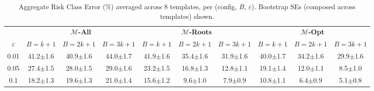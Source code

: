 \providecommand{\pmstd}[1]{{\scriptsize $\pm$#1}}

\begin{table}[t]
\centering
\small
\caption{Aggregate Risk Class Error (\%) averaged across 8 templates, per (config, $B$, $\varepsilon$). Bootstrap SEs (composed across templates) shown.}
\label{tab:agent_aggregate_rce}
\begin{tabular}{c|ccc|ccc|ccc}
\toprule
& \multicolumn{3}{c|}{\textbf{$\mathcal{M}$-All}} & \multicolumn{3}{c|}{\textbf{$\mathcal{M}$-Roots}} & \multicolumn{3}{c}{\textbf{$\mathcal{M}$-Opt}} \\
$\varepsilon$ & $B{=}k+1$ & $B{=}2k+1$ & $B{=}3k+1$ & $B{=}k+1$ & $B{=}2k+1$ & $B{=}3k+1$ & $B{=}k+1$ & $B{=}2k+1$ & $B{=}3k+1$ \\
\midrule
0.01 & 41.2\pmstd{1.6} & 40.9\pmstd{1.6} & 44.0\pmstd{1.7} & 41.9\pmstd{1.6} & 35.4\pmstd{1.6} & 31.9\pmstd{1.6} & 40.0\pmstd{1.7} & 34.2\pmstd{1.6} & 29.9\pmstd{1.6} \\
0.05 & 27.4\pmstd{1.5} & 28.0\pmstd{1.5} & 29.0\pmstd{1.6} & 23.2\pmstd{1.5} & 16.8\pmstd{1.3} & 12.8\pmstd{1.1} & 19.1\pmstd{1.4} & 12.0\pmstd{1.1} & 8.5\pmstd{1.0} \\
0.1 & 18.2\pmstd{1.3} & 19.6\pmstd{1.3} & 21.0\pmstd{1.4} & 15.6\pmstd{1.2} & 9.6\pmstd{1.0} & 7.9\pmstd{0.9} & 10.8\pmstd{1.1} & 6.4\pmstd{0.9} & 5.1\pmstd{0.8} \\
\bottomrule
\end{tabular}
\end{table}
